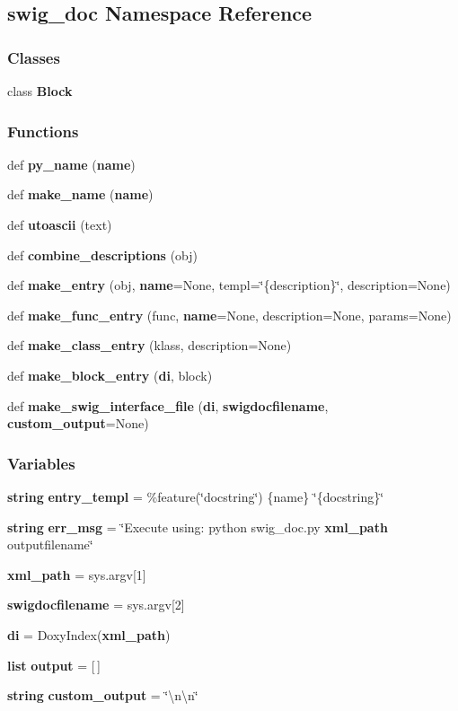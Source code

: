 \subsection{swig\+\_\+doc Namespace Reference}
\label{namespaceswig__doc}
\subsubsection*{Classes}
\begin{DoxyCompactItemize}
\item 
class {\bf Block}
\end{DoxyCompactItemize}
\subsubsection*{Functions}
\begin{DoxyCompactItemize}
\item 
def {\bf py\+\_\+name} ({\bf name})
\item 
def {\bf make\+\_\+name} ({\bf name})
\item 
def {\bf utoascii} (text)
\item 
def {\bf combine\+\_\+descriptions} (obj)
\item 
def {\bf make\+\_\+entry} (obj, {\bf name}=None, templ=\char`\"{}\{description\}\char`\"{}, description=None)
\item 
def {\bf make\+\_\+func\+\_\+entry} (func, {\bf name}=None, description=None, params=None)
\item 
def {\bf make\+\_\+class\+\_\+entry} (klass, description=None)
\item 
def {\bf make\+\_\+block\+\_\+entry} ({\bf di}, block)
\item 
def {\bf make\+\_\+swig\+\_\+interface\+\_\+file} ({\bf di}, {\bf swigdocfilename}, {\bf custom\+\_\+output}=None)
\end{DoxyCompactItemize}
\subsubsection*{Variables}
\begin{DoxyCompactItemize}
\item 
{\bf string} {\bf entry\+\_\+templ} = \textquotesingle{}\%feature(\char`\"{}docstring\char`\"{}) \{name\} \char`\"{}\{docstring\}\char`\"{}\textquotesingle{}
\item 
{\bf string} {\bf err\+\_\+msg} = \char`\"{}Execute using\+: python swig\+\_\+doc.\+py {\bf xml\+\_\+path} outputfilename\char`\"{}
\item 
{\bf xml\+\_\+path} = sys.\+argv[1]
\item 
{\bf swigdocfilename} = sys.\+argv[2]
\item 
{\bf di} = Doxy\+Index({\bf xml\+\_\+path})
\item 
{\bf list} {\bf output} = [$\,$]
\item 
{\bf string} {\bf custom\+\_\+output} = \char`\"{}\textbackslash{}n\textbackslash{}n\char`\"{}
\end{DoxyCompactItemize}


